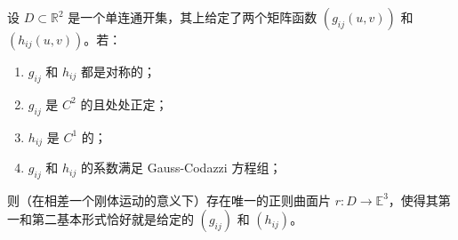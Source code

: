 \documentclass[lang=cn,10pt,thmcnt=section]{elegantbook}
\begin{document}
\begin{theorem}
    设 $D \subset \mathbb{R}^2$ 是一个单连通开集，其上给定了两个矩阵函数 $(g_{ij}(u,v))$ 和 $(h_{ij}(u,v))$。若：
    \begin{enumerate}
        \item $g_{ij}$ 和 $h_{ij}$ 都是对称的；
        \item $g_{ij}$ 是 $C^2$ 的且处处正定；
        \item $h_{ij}$ 是 $C^1$ 的；
        \item $g_{ij}$ 和 $h_{ij}$ 的系数满足 Gauss-Codazzi 方程组；
    \end{enumerate}
    则（在相差一个刚体运动的意义下）存在唯一的正则曲面片 $r: D \to \mathbb{E}^3$，使得其第一和第二基本形式恰好就是给定的 $(g_{ij})$ 和 $(h_{ij})$。
\end{theorem}
\end{document}
